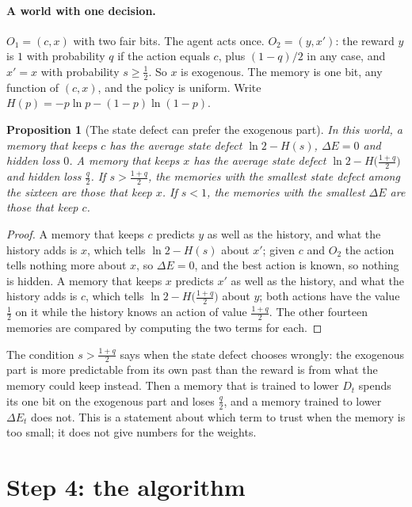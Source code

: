 \documentclass[11pt]{article}
\newtheorem{proposition}{Proposition}
\theoremstyle{definition}
\newcommand{\dE}{\Delta E}
\begin{document}
\paragraph{A world with one decision.} $O_1=(c,x)$ with two fair bits. The agent acts once. $O_2=(y,x')$: the reward $y$ is $1$ with probability $q$ if the action equals $c$, plus $(1-q)/2$ in any case, and $x'=x$ with probability $s\ge\tfrac12$. So $x$ is exogenous. The memory is one bit, any function of $(c,x)$, and the policy is uniform. Write $H(p)=-p\ln p-(1-p)\ln(1-p)$.

\begin{proposition}[The state defect can prefer the exogenous part]\label{prop:exoD}
In this world, a memory that keeps $c$ has the average state defect $\ln2-H(s)$, $\dE=0$ and hidden loss $0$. A memory that keeps $x$ has the average state defect $\ln2-H\big(\tfrac{1+q}2\big)$ and hidden loss $\tfrac q2$. If $s>\tfrac{1+q}2$, the memories with the smallest state defect among the sixteen are those that keep $x$. If $s<1$, the memories with the smallest $\dE$ are those that keep $c$.
\end{proposition}
\begin{proof}
A memory that keeps $c$ predicts $y$ as well as the history, and what the history adds is $x$, which tells $\ln2-H(s)$ about $x'$; given $c$ and $O_2$ the action tells nothing more about $x$, so $\dE=0$, and the best action is known, so nothing is hidden. A memory that keeps $x$ predicts $x'$ as well as the history, and what the history adds is $c$, which tells $\ln2-H\big(\tfrac{1+q}2\big)$ about $y$; both actions have the value $\tfrac12$ on it while the history knows an action of value $\tfrac{1+q}2$. The other fourteen memories are compared by computing the two terms for each.
\end{proof}

The condition $s>\tfrac{1+q}2$ says when the state defect chooses wrongly: the exogenous part is more predictable from its own past than the reward is from what the memory could keep instead. Then a memory that is trained to lower $D_t$ spends its one bit on the exogenous part and loses $\tfrac q2$, and a memory trained to lower $\dE_t$ does not. This is a statement about which term to trust when the memory is too small; it does not give numbers for the weights.

\section{Step 4: the algorithm}\label{sec:algo}
\end{document}

